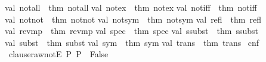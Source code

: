 \begin{isabellebody}
val\ not{\isacharunderscore}{\kern0pt}all\ {\isacharequal}{\kern0pt}\ {\isacharat}{\kern0pt}{\isacharbraceleft}{\kern0pt}thm\ not{\isacharunderscore}{\kern0pt}all{\isacharbraceright}{\kern0pt}\isanewline
val\ not{\isacharunderscore}{\kern0pt}ex\ {\isacharequal}{\kern0pt}\ {\isacharat}{\kern0pt}{\isacharbraceleft}{\kern0pt}thm\ not{\isacharunderscore}{\kern0pt}ex{\isacharbraceright}{\kern0pt}\isanewline
val\ not{\isacharunderscore}{\kern0pt}iff\ {\isacharequal}{\kern0pt}\ {\isacharat}{\kern0pt}{\isacharbraceleft}{\kern0pt}thm\ not{\isacharunderscore}{\kern0pt}iff{\isacharbraceright}{\kern0pt}\isanewline
val\ not{\isacharunderscore}{\kern0pt}not\ {\isacharequal}{\kern0pt}\ {\isacharat}{\kern0pt}{\isacharbraceleft}{\kern0pt}thm\ not{\isacharunderscore}{\kern0pt}not{\isacharbraceright}{\kern0pt}\isanewline
val\ not{\isacharunderscore}{\kern0pt}sym\ {\isacharequal}{\kern0pt}\ {\isacharat}{\kern0pt}{\isacharbraceleft}{\kern0pt}thm\ not{\isacharunderscore}{\kern0pt}sym{\isacharbraceright}{\kern0pt}\isanewline
val\ refl\ {\isacharequal}{\kern0pt}\ {\isacharat}{\kern0pt}{\isacharbraceleft}{\kern0pt}thm\ refl{\isacharbraceright}{\kern0pt}\isanewline
val\ rev{\isacharunderscore}{\kern0pt}mp\ {\isacharequal}{\kern0pt}\ {\isacharat}{\kern0pt}{\isacharbraceleft}{\kern0pt}thm\ rev{\isacharunderscore}{\kern0pt}mp{\isacharbraceright}{\kern0pt}\isanewline
val\ spec\ {\isacharequal}{\kern0pt}\ {\isacharat}{\kern0pt}{\isacharbraceleft}{\kern0pt}thm\ spec{\isacharbraceright}{\kern0pt}\isanewline
val\ ssubst\ {\isacharequal}{\kern0pt}\ {\isacharat}{\kern0pt}{\isacharbraceleft}{\kern0pt}thm\ ssubst{\isacharbraceright}{\kern0pt}\isanewline
val\ subst\ {\isacharequal}{\kern0pt}\ {\isacharat}{\kern0pt}{\isacharbraceleft}{\kern0pt}thm\ subst{\isacharbraceright}{\kern0pt}\isanewline
val\ sym\ {\isacharequal}{\kern0pt}\ {\isacharat}{\kern0pt}{\isacharbraceleft}{\kern0pt}thm\ sym{\isacharbraceright}{\kern0pt}\isanewline
val\ trans\ {\isacharequal}{\kern0pt}\ {\isacharat}{\kern0pt}{\isacharbraceleft}{\kern0pt}thm\ trans{\isacharbraceright}{\kern0pt}\isanewline
{\isacartoucheclose}%
\endisatagML
{\isafoldML}%
%
\isadelimML
\isanewline
%
\endisadelimML
\isanewline
{}\isamarkupfalse%
\ cnf\isanewline
{}\isanewline
\isanewline
{}\isamarkupfalse%
\ clause{}raw{\isacharunderscore}{\kern0pt}notE{\isacharcolon}{\kern0pt}\ {\isachardoublequoteopen}{\isasymlbrakk}P{\isacharsemicolon}{\kern0pt}\ {\isasymnot}P{\isasymrbrakk}\ {\isasymLongrightarrow}\ False{\isachardoublequoteclose}%
\isadelimproof
\ %
\endisadelimproof
%
\isatagproof
{}\isamarkupfalse%

\end{isabellebody}
